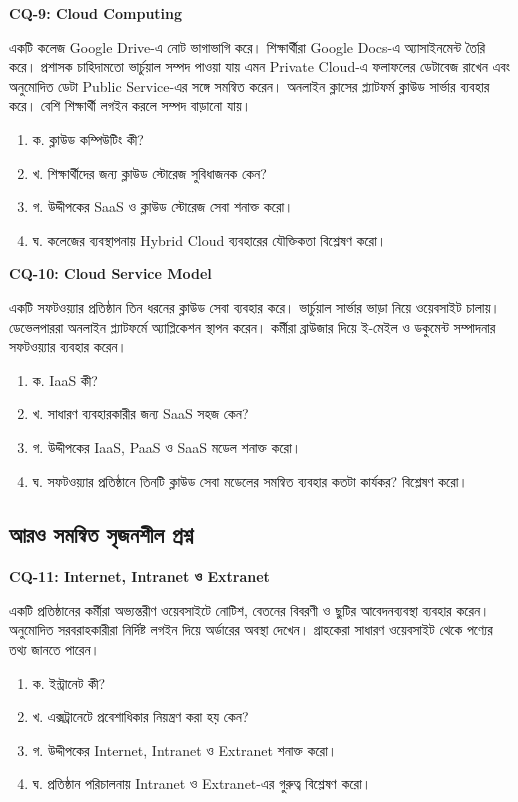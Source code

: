 \textbf{CQ-9: Cloud Computing}

একটি কলেজ Google Drive-এ নোট ভাগাভাগি করে। শিক্ষার্থীরা Google Docs-এ অ্যাসাইনমেন্ট তৈরি করে। প্রশাসক চাহিদামতো ভার্চুয়াল সম্পদ পাওয়া যায় এমন Private Cloud-এ ফলাফলের ডেটাবেজ রাখেন এবং অনুমোদিত ডেটা Public Service-এর সঙ্গে সমন্বিত করেন। অনলাইন ক্লাসের প্ল্যাটফর্ম ক্লাউড সার্ভার ব্যবহার করে। বেশি শিক্ষার্থী লগইন করলে সম্পদ বাড়ানো যায়।

\begin{enumerate}
\item ক. ক্লাউড কম্পিউটিং কী?
\item খ. শিক্ষার্থীদের জন্য ক্লাউড স্টোরেজ সুবিধাজনক কেন?
\item গ. উদ্দীপকের SaaS ও ক্লাউড স্টোরেজ সেবা শনাক্ত করো।
\item ঘ. কলেজের ব্যবস্থাপনায় Hybrid Cloud ব্যবহারের যৌক্তিকতা বিশ্লেষণ করো।
\end{enumerate}

\textbf{CQ-10: Cloud Service Model}

একটি সফটওয়্যার প্রতিষ্ঠান তিন ধরনের ক্লাউড সেবা ব্যবহার করে। ভার্চুয়াল সার্ভার ভাড়া নিয়ে ওয়েবসাইট চালায়। ডেভেলপাররা অনলাইন প্ল্যাটফর্মে অ্যাপ্লিকেশন স্থাপন করেন। কর্মীরা ব্রাউজার দিয়ে ই-মেইল ও ডকুমেন্ট সম্পাদনার সফটওয়্যার ব্যবহার করেন।

\begin{enumerate}
\item ক. IaaS কী?
\item খ. সাধারণ ব্যবহারকারীর জন্য SaaS সহজ কেন?
\item গ. উদ্দীপকের IaaS, PaaS ও SaaS মডেল শনাক্ত করো।
\item ঘ. সফটওয়্যার প্রতিষ্ঠানে তিনটি ক্লাউড সেবা মডেলের সমন্বিত ব্যবহার কতটা কার্যকর? বিশ্লেষণ করো।
\end{enumerate}

\subsection{আরও সমন্বিত সৃজনশীল প্রশ্ন}

\par
\textbf{CQ-11: Internet, Intranet ও Extranet}

একটি প্রতিষ্ঠানের কর্মীরা অভ্যন্তরীণ ওয়েবসাইটে নোটিশ, বেতনের বিবরণী ও ছুটির আবেদনব্যবস্থা ব্যবহার করেন। অনুমোদিত সরবরাহকারীরা নির্দিষ্ট লগইন দিয়ে অর্ডারের অবস্থা দেখেন। গ্রাহকেরা সাধারণ ওয়েবসাইট থেকে পণ্যের তথ্য জানতে পারেন।

\begin{enumerate}
\item ক. ইন্ট্রানেট কী?
\item খ. এক্সট্রানেটে প্রবেশাধিকার নিয়ন্ত্রণ করা হয় কেন?
\item গ. উদ্দীপকের Internet, Intranet ও Extranet শনাক্ত করো।
\item ঘ. প্রতিষ্ঠান পরিচালনায় Intranet ও Extranet-এর গুরুত্ব বিশ্লেষণ করো।
\end{enumerate}

